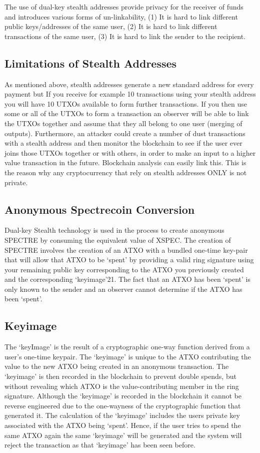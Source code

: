The use of dual-key stealth addresses provide privacy for the receiver of
funds and introduces various forms of un-linkability, (1) It is hard to
link different public keys/addresses of the same user, (2) It is hard to
link different transactions of the same user, (3) It is hard to link the
sender to the recipient.


\subsection{Limitations of Stealth Addresses}
As mentioned above, stealth addresses generate a new standard address for
every payment but If you receive for example 10 transactions using your
stealth address you will have 10 UTXOs available to form further
transactions. If you then use some or all of the UTXOs to form a transaction
an observer will be able to link the UTXOs together and assume that they all
belong to one user (merging of outputs). Furthermore, an attacker could
create a number of dust transactions with a stealth address and then monitor
the blockchain to see if the user ever joins those UTXOs together or with
others, in order to make an input to a higher value transaction in the future.
Blockchain analysis can easily link this. This is the reason why any
cryptocurrency that rely on stealth addresses ONLY is not private.



\subsection{Anonymous Spectrecoin Conversion}
Dual-key Stealth technology is used in the process to create anonymous SPECTRE
by consuming the equivalent value of XSPEC. The creation of SPECTRE involves
the creation of an ATXO with a bundled one-time key-pair that will allow that
ATXO to be ‘spent’ by providing a valid ring signature using your remaining
public key corresponding to the ATXO you previously created and the
corresponding ‘keyimage’21. The fact that an ATXO has been ‘spent’ is only
known to the sender and an observer cannot determine if the ATXO has been
‘spent’.



\subsection{Keyimage}
The ‘keyImage’ is the result of a cryptographic one-way function derived
from a user’s one-time keypair. The ‘keyimage’ is unique to the ATXO
contributing the value to the new ATXO being created in an anonymous
transaction. The ‘keyimage’ is then recorded in the blockchain to prevent
double spends, but without revealing which ATXO is the value-contributing
member in the ring signature. Although the ‘keyimage’ is recorded in the
blockchain it cannot be reverse engineered due to the one-wayness of the
cryptographic function that generated it. The calculation of the ‘keyimage’
includes the users private key associated with the ATXO being ‘spent’.
Hence, if the user tries to spend the same ATXO again the same ‘keyimage’
will be generated and the system will reject the transaction as that
‘keyimage’ has been seen before.



